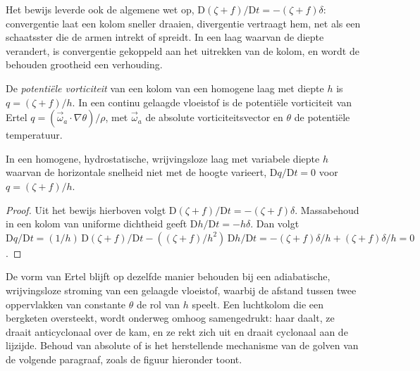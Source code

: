 Het bewijs leverde ook de algemene wet op, $\mathrm D(\zeta + f)/\mathrm Dt =
-(\zeta + f)\delta$: convergentie laat een kolom sneller draaien, divergentie vertraagt hem,
net als een schaatsster die de armen intrekt of spreidt. In een laag waarvan
de diepte verandert, is convergentie gekoppeld aan het uitrekken van de kolom, en
wordt de behouden grootheid een verhouding.

\begin{definition}\label{def:b3:atmospheric-dynamics:pv}
De \emph{potentiële vorticiteit} van een kolom van een
homogene laag met diepte $h$ is $q = (\zeta + f)/h$. In een continu gelaagde
vloeistof is de potentiële vorticiteit van Ertel $q = (\vec\omega_a\cdot
\nabla\theta)/\rho$, met $\vec\omega_a$ de absolute vorticiteitsvector en
$\theta$ de potentiële temperatuur.
\end{definition}

\begin{theorem}\label{thm:b3:atmospheric-dynamics:pv}
In een homogene, hydrostatische, wrijvingsloze laag met variabele diepte $h$ waarvan
de horizontale snelheid niet met de hoogte varieert, $\mathrm Dq/\mathrm Dt = 0$
voor $q = (\zeta + f)/h$.
\end{theorem}

\begin{proof}
Uit het bewijs hierboven volgt $\mathrm D(\zeta + f)/\mathrm Dt = -(\zeta + f)\delta$.
Massabehoud in een kolom van uniforme dichtheid geeft $\mathrm Dh/\mathrm
Dt = -h\delta$. Dan volgt $\mathrm Dq/\mathrm Dt = (1/h)\,\mathrm D(\zeta +
f)/\mathrm Dt - ((\zeta + f)/h^2)\,\mathrm Dh/\mathrm Dt = -(\zeta +
f)\delta/h + (\zeta + f)\delta/h = 0$.
\end{proof}

De vorm van Ertel blijft op dezelfde manier behouden bij een adiabatische, wrijvingsloze
stroming van een gelaagde vloeistof, waarbij de afstand tussen twee oppervlakken van
constante $\theta$ de rol van $h$ speelt. Een luchtkolom die een
bergketen oversteekt, wordt onderweg omhoog samengedrukt: haar  daalt, ze
draait anticyclonaal over de kam, en ze rekt zich uit en draait
cyclonaal aan de lijzijde. Behoud van
absolute of  is het herstellende mechanisme van de golven
van de volgende paragraaf, zoals de figuur hieronder toont.

